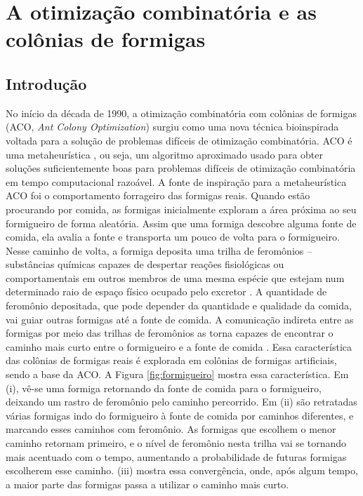 \section{A otimização combinatória e as colônias de formigas}
\label{chapter:aco}

\subsection{Introdução}

No início da década de 1990, a otimização combinatória com colônias de formigas
(ACO, \textit{Ant Colony
Optimization}) \cite{dorigo1992optimization, dorigo1991positive, dorigo1996ant} surgiu como uma
nova técnica bioinspirada voltada para a solução de problemas difíceis
de otimização combinatória. ACO é uma metaheurística \cite{glover2003handbook},
ou seja, um algoritmo aproximado usado para obter soluções suficientemente
boas para problemas difíceis de otimização combinatória em tempo computacional
razoável. A fonte de inspiração para a metaheurística ACO foi o comportamento
forrageiro das formigas reais. Quando estão procurando por comida, as formigas
inicialmente exploram a área próxima ao seu formigueiro de forma aleatória.
Assim que uma formiga descobre alguma fonte de comida, ela avalia a fonte e
transporta um pouco de volta para o formigueiro. Nesse caminho de volta, a
formiga deposita uma trilha de feromônios --
substâncias químicas capazes de despertar reações fisiológicas ou
comportamentais em outros membros de uma mesma espécie que estejam num
determinado raio de espaço físico ocupado pelo excretor
\cite{karlson1959pheromones}. A quantidade de feromônio depositada, que pode
depender da quantidade e qualidade da comida, vai guiar outras formigas até a
fonte de comida. A comunicação indireta entre as formigas por meio das trilhas
de feromônios as torna capazes de encontrar o caminho mais curto entre o
formigueiro e a fonte de comida \cite{deneubourg1990self}. Essa característica
das colônias de formigas reais é explorada em colônias de formigas
artificiais, sendo a base da ACO. A Figura \ref{fig:formigueiro} mostra essa
característica. Em (i), vê-se uma formiga retornando da fonte de comida para o
formigueiro, deixando um rastro de feromônio pelo caminho percorrido. Em (ii)
são retratadas várias formigas indo do formigueiro à fonte de comida por
caminhos diferentes, e marcando esses caminhos com feromônio. As formigas que
escolhem o menor caminho retornam primeiro, e o nível de feromônio nesta
trilha vai se tornando mais acentuado com o tempo, aumentando a probabilidade
de futuras formigas escolherem esse caminho. (iii) mostra essa convergência,
onde, após algum tempo, a maior parte das formigas passa a utilizar o caminho
mais curto.

